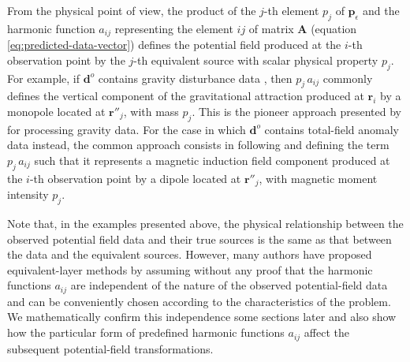 From the physical point of view, the product of the $j$-th element $p_{j}$ of $\mathbf{p}_{\epsilon}$ 
and the harmonic function $a_{ij}$ representing the element $ij$ of matrix $\mathbf{A}$ 
(equation \ref{eq:predicted-data-vector}) defines the potential field produced at the $i$-th observation
point by the $j$-th equivalent source with scalar physical property $p_{j}$.
For example, if $\mathbf{d}^{o}$ contains gravity disturbance data
\cite[e.g.,][ p. 93]{hofmann-wellenhof-moritz2005}, then
$p_{j} \, a_{ij}$ commonly defines the vertical component of the gravitational attraction
produced at $\mathbf{r}_{i}$ by a monopole located at
$\mathbf{r}''_{j}$, with mass $p_{j}$. 
This is the pioneer approach presented by \cite{dampney1969} for 
processing gravity data.
For the case in which $\mathbf{d}^{o}$ contains total-field anomaly data 
\cite[e.g.,][ p. 178]{blakely1996} instead, the common approach consists in
following \cite{emilia1973} and defining the term $p_{j} \, a_{ij}$ such
that it represents a magnetic induction field component 
produced at the $i$-th observation point by a dipole located at $\mathbf{r}''_{j}$,
with magnetic moment intensity $p_{j}$.

Note that, in the examples presented above, the physical relationship 
between the observed potential field data and their true sources is the
same as that between the data and the equivalent sources.
However, many authors 
\cite[e.g.,][]{cordell1992, guspi_novara2009, li_etal2014, soler_uieda2021} 
have proposed equivalent-layer methods by assuming without any proof that the harmonic functions $a_{ij}$ are 
independent of the nature of the observed potential-field data and can be 
conveniently chosen according to the characteristics of the problem.
We mathematically confirm this independence some sections later and also show how 
the particular form of predefined harmonic functions $a_{ij}$ affect the subsequent 
potential-field transformations.
